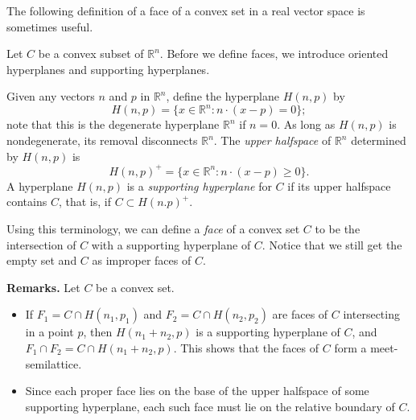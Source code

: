 \documentclass[12pt]{article}
\begin{document}
The following definition of a face of a convex set in a real vector
space is sometimes useful.

Let $C$ be a convex subset of $\mathbb{R}^n$.  Before we define faces,
we introduce oriented hyperplanes and supporting hyperplanes.

Given any vectors $n$ and $p$ in $\mathbb{R}^n$, define the hyperplane
$H(n,p)$ by
\[
  H(n,p) = \{ x \in \mathbb{R}^n \colon n \cdot (x - p) = 0 \};
\]
note that this is the degenerate hyperplane $\mathbb{R}^n$ if $n=0$.
As long as $H(n,p)$ is nondegenerate, its removal disconnects
$\mathbb{R}^n$.  The \emph{upper halfspace} of $\mathbb{R}^n$ determined by
$H(n,p)$ is
\[
   H(n,p)^+ = \{ x \in \mathbb{R}^n \colon n \cdot (x - p) \ge 0 \}.
\]
A hyperplane $H(n,p)$ is a \emph{supporting hyperplane} for
$C$ if its upper halfspace contains $C$, that is, if $C\subset H(n.p)^+$.

Using this terminology, we can define a \emph{face} of a convex set
$C$ to be the intersection of $C$ with a supporting hyperplane of $C$.
Notice that we still get the empty set and $C$ as improper faces of $C$.

\textbf{Remarks.}  Let $C$ be a convex set.
\begin{itemize}
\item
If $F_1 = C\cap H(n_1,p_1)$ and $F_2 = C\cap H(n_2,p_2)$ are faces
of $C$ intersecting in a point $p$, then $H(n_1+n_2,p)$ is a
supporting hyperplane of $C$, and $F_1\cap F_2 = C\cap H(n_1+n_2,p)$.
This shows that the faces of $C$ form a meet-semilattice.

\item
Since each proper face lies on the base of the upper halfspace of some
supporting hyperplane, each such face must lie on the relative
boundary of $C$.
\end{itemize}

\end{document}
